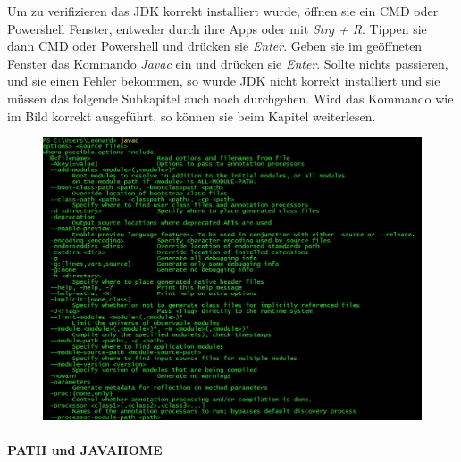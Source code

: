 \documentclass[fontsize=12pt,paper=a4,twoside]{scrartcl}
\begin{document}
Um zu verifizieren das JDK korrekt installiert wurde, öffnen sie ein CMD oder Powershell Fenster, entweder durch ihre Apps oder mit \textit{Strg + R}. Tippen sie dann CMD oder Powershell und drücken sie \textit{Enter}. Geben sie im geöffneten Fenster das Kommando \textit{Javac} ein und drücken sie \textit{Enter}. Sollte nichts passieren, und sie einen Fehler bekommen, so wurde JDK nicht korrekt installiert und sie müssen das folgende Subkapitel auch noch durchgehen. Wird das Kommando wie im Bild korrekt ausgeführt, so können sie beim Kapitel  weiterlesen. 

\begin{figure}[h!]
\centering
\includegraphics[width=\linewidth]{JavacWindows.JPG}
\end{figure}


\newpage
\paragraph{PATH und JAVA\textunderscore HOME}
\end{document}
